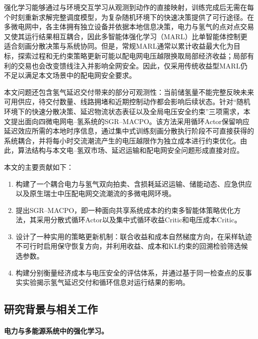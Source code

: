 \documentclass[final,5p,times]{elsarticle}
\newcommand{\method}{SGR--MACPO\xspace}
\begin{document}
强化学习能够通过与环境交互学习从观测到动作的直接映射，训练完成后无需在每个时刻重新求解完整调度模型，为复杂随机环境下的快速决策提供了可行途径\cite{he2025hydrogen}。在多微电网中，各主体拥有独立设备并依据本地信息决策，电力与氢气的点对点交易又使其运行结果相互耦合，因此多智能体强化学习（MARL）比单智能体控制更适合刻画分散决策与系统协同\cite{samadi2020decentralized,fang2021multiagent,zhang2023interconnected}。但是，常规MARL通常以累计收益最大化为目标，探索过程和无约束策略更新可能以配电网电压越限换取局部经济收益；局部有利的交易也会改变馈线注入并影响全网安全\cite{paudel2019p2p,tushar2020p2p,sousa2019p2p,morstyn2018p2p}。因此，仅采用传统收益型MARL仍不足以满足本文场景中的配电网安全要求。

本文问题还包含氢气延迟交付带来的部分可观测性：当前储氢量不能完整反映未来可用供应，待交付数量、线路拥堵和近期控制动作都会影响后续状态。针对“随机环境下的快速分散决策、延迟物流状态表征以及全局电压安全约束”三项需求，本文提出面向四微电网电--氢系统的\method。该方法采用循环Actor保留响应延迟效应所需的本地时序信息，通过集中式训练刻画分散执行阶段不可直接获得的系统耦合，并将每小时交流潮流产生的电压越限作为独立成本进行约束优化。由此，算法结构与本文电--氢双市场、延迟运输和配电网安全问题形成直接对应。

本文的主要贡献如下：
\begin{enumerate}
  \item 构建了一个耦合电力与氢气双向拍卖、含损耗延迟运输、储能动态、应急供应以及原生瑞士中压配电网交流潮流的多微电网环境。
  \item 提出\method，即一种面向共享系统成本的约束多智能体策略优化方法，其采用分散式循环Actor以及集中式循环收益Critic和电压成本Critic。
  \item 设计了一种实用的策略更新机制：联合收益和成本自然梯度方向，在采样轨迹不可行时启用保守恢复方向，并利用收益、成本和KL约束的回溯检验筛选候选参数。
  \item 构建分别衡量经济成本与电压安全的评估体系，并通过基于同一检查点的反事实实验揭示氢气延迟交付和循环信息对运行结果的影响。
\end{enumerate}

\subsection{研究背景与相关工作}
\label{sec:related}

\paragraph{电力与多能源系统中的强化学习。}
\end{document}
